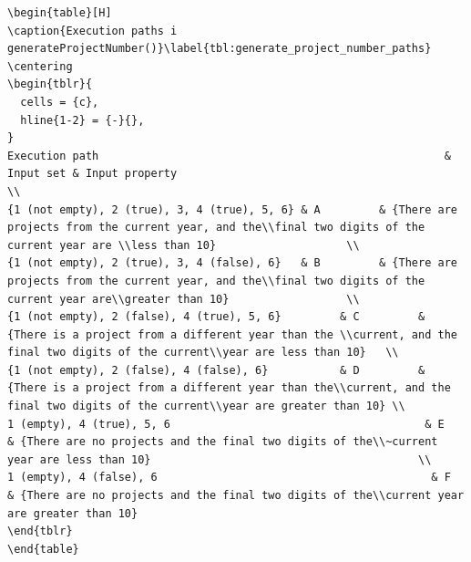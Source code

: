 \begin{listing}[H]
\begin{verbatim}
\begin{table}[H]
\caption{Execution paths i generateProjectNumber()}\label{tbl:generate_project_number_paths}
\centering
\begin{tblr}{
  cells = {c},
  hline{1-2} = {-}{},
}
Execution path                                                     & Input set & Input property                                                                                                                  \\
{1 (not empty), 2 (true), 3, 4 (true), 5, 6} & A         & {There are projects from the current year, and the\\final two digits of the current year are \\less than 10}                    \\
{1 (not empty), 2 (true), 3, 4 (false), 6}   & B         & {There are projects from the current year, and the\\final two digits of the current year are\\greater than 10}                  \\
{1 (not empty), 2 (false), 4 (true), 5, 6}         & C         & {There is a project from a different year than the \\current, and the final two digits of the current\\year are less than 10}   \\
{1 (not empty), 2 (false), 4 (false), 6}           & D         & {There is a project from a different year than the\\current, and the final two digits of the current\\year are greater than 10} \\
1 (empty), 4 (true), 5, 6                                       & E         & {There are no projects and the final two digits of the\\~current year are less than 10}                                         \\
1 (empty), 4 (false), 6                                          & F         & {There are no projects and the final two digits of the\\current year are greater than 10}                                       
\end{tblr}
\end{table}                


\end{verbatim}
\end{listing}
